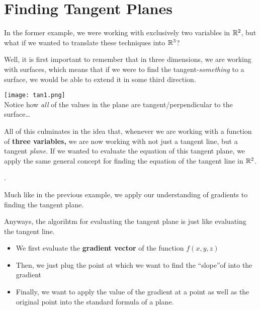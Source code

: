 \documentclass{report}
\begin{document}
\begin{sloppypar}
\section{Finding Tangent Planes}
In the former example, we were working with
exclusively two variables in $ \mathbb{R}^{2}$, but what
if we wanted to translate these techniques into
$ \mathbb{R}^{3}$?
\par Well, it is first important to remember
that in three dimensions, we are working with surfaces,
which means that if we were to find the tangent-\textit{something} to a surface, we would be able
to extend it in some third direction.
\begin{center}
  \texttt{[image: tan1.png]} \\
  \caption{Notice how \textit{all} of the values
    in the plane are tangent/perpendicular to the
  surface\dots}
\end{center}
All of this culminates in the idea that, whenever
we are working with a function of \textbf{three variables,} we are now working with not just a tangent line, but a tangent \textit{plane}. If we wanted
to evaluate the equation of this tangent plane,
we apply the same general concept for finding
the equation of the tangent line in $ \mathbb{R}^{2} $.

.

Much like in the previous example, we apply
our understanding of gradients to
finding the tangent plane.

Anyways, the algorihtm for evaluating the tangent plane is just like evaluating the tangent line.
\begin{itemize}
  \item We first evaluate the \textbf{gradient vector} of the function $f(x,y,z)$
  \item Then, we just plug the point at which
        we want to find the ``slope''of into
        the gradient
  \item Finally, we want to apply the
        value of the gradient at a point as well
        as the original point into the standard
        formula of a plane.
\end{itemize}


\end{sloppypar}
\end{document}
